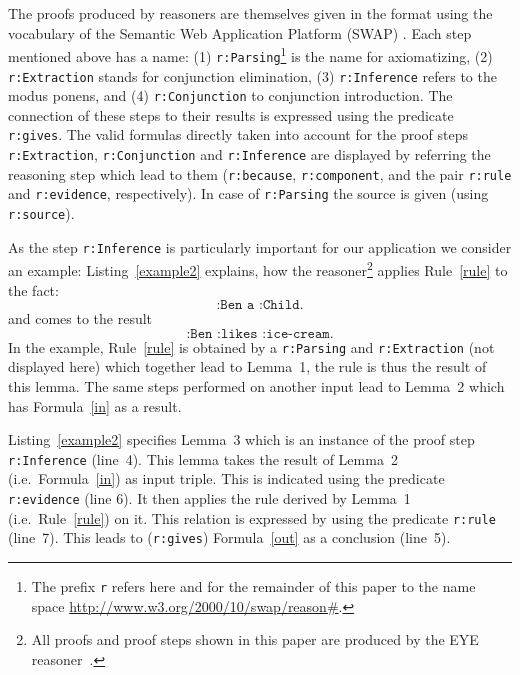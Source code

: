The proofs produced by \nthree reasoners are themselves given in the \nthree format using the 
vocabulary 
of the Semantic Web Application
Platform (SWAP) \cite{SWAP}.
Each step mentioned above has a name: (1) \texttt{r:Parsing}\footnote{The prefix \texttt{r} refers 
here and for the remainder of this paper to the name space \url{http://www.w3.org/2000/10/swap/reason\#}.
 } is the name for axiomatizing,  
(2) \texttt{r:Extraction} stands for conjunction elimination, 
(3) \texttt{r:Inference} refers to the modus ponens, and
(4) \texttt{r:Conjunction} to conjunction introduction. 
The connection of these steps to their results is expressed using the predicate \texttt{r:gives}.
The valid formulas directly taken into account for the proof steps \texttt{r:Extraction},
\texttt{r:Conjunction} and \texttt{r:Inference} 
are displayed by referring the reasoning step which lead to them (\texttt{r:because}, \texttt{r:component}, and the pair \texttt{r:rule} and \texttt{r:evidence}, respectively).
In case of \texttt{r:Parsing} the source is given (using \texttt{r:source}).

As the step \texttt{r:Inference} is particularly important for our application we consider an example: 
Listing~\ref{example2} explains, how the reasoner\footnote{All proofs and proof steps shown in this paper are produced by the EYE reasoner~\cite{verborgh_software_2015}.} 
applies Rule~\ref{rule}  to the fact:
\begin{equation}\label{in}
 \texttt{:Ben a :Child.}
\end{equation}
and comes to the result 
\begin{equation}\label{out}
 \texttt{:Ben :likes :ice-cream.}
\end{equation}
In the example, Rule~\ref{rule} is obtained by a \texttt{r:Parsing} and \texttt{r:Extraction} (not displayed here) which together lead to Lemma~1, 
the rule is thus the result of this lemma. The same steps performed on another input lead to Lemma~2 which has Formula~\ref{in} as a result. 

Listing~\ref{example2} specifies Lemma~3 which is an instance of the proof step
\texttt{r:Inference} (line~4). 
This lemma takes the result of Lemma~2 (i.e.\ Formula~\ref{in}) as input triple. This is indicated using the predicate \texttt{r:evidence} (line 6).
It then applies the rule derived by Lemma~1 (i.e.\ Rule~\ref{rule}) on it. This relation is expressed by using the predicate \texttt{r:rule} (line~7). 
This leads to (\texttt{r:gives}) Formula~\ref{out} as a conclusion (line~5).

